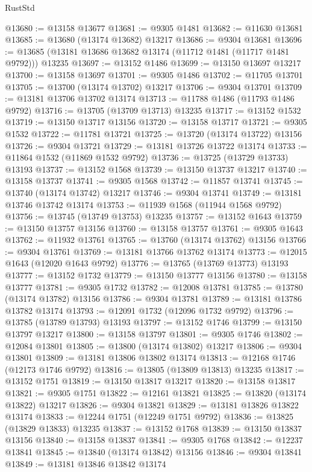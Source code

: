 \begin{lexlean}{RustStd}
\begin{coremodule}
@13680 := @13158 @13677
@13681 := @9305 @1481
@13682 := @11630 @13681
@13685 := @13680 (@13174 @13682) @13217
@13686 := @9304 @13681
@13696 := @13685 (@13181 @13686 @13682 @13174 (@11712 @1481 (@11717 @1481 @9792))) @13235
@13697 := @13152 @1486
@13699 := @13150 @13697 @13217
@13700 := @13158 @13697
@13701 := @9305 @1486
@13702 := @11705 @13701
@13705 := @13700 (@13174 @13702) @13217
@13706 := @9304 @13701
@13709 := @13181 @13706 @13702 @13174
@13713 := @11788 @1486 (@11793 @1486 @9792)
@13716 := @13705 (@13709 @13713) @13235
@13717 := @13152 @1532
@13719 := @13150 @13717 @13156
@13720 := @13158 @13717
@13721 := @9305 @1532
@13722 := @11781 @13721
@13725 := @13720 (@13174 @13722) @13156
@13726 := @9304 @13721
@13729 := @13181 @13726 @13722 @13174
@13733 := @11864 @1532 (@11869 @1532 @9792)
@13736 := @13725 (@13729 @13733) @13193
@13737 := @13152 @1568
@13739 := @13150 @13737 @13217
@13740 := @13158 @13737
@13741 := @9305 @1568
@13742 := @11857 @13741
@13745 := @13740 (@13174 @13742) @13217
@13746 := @9304 @13741
@13749 := @13181 @13746 @13742 @13174
@13753 := @11939 @1568 (@11944 @1568 @9792)
@13756 := @13745 (@13749 @13753) @13235
@13757 := @13152 @1643
@13759 := @13150 @13757 @13156
@13760 := @13158 @13757
@13761 := @9305 @1643
@13762 := @11932 @13761
@13765 := @13760 (@13174 @13762) @13156
@13766 := @9304 @13761
@13769 := @13181 @13766 @13762 @13174
@13773 := @12015 @1643 (@12020 @1643 @9792)
@13776 := @13765 (@13769 @13773) @13193
@13777 := @13152 @1732
@13779 := @13150 @13777 @13156
@13780 := @13158 @13777
@13781 := @9305 @1732
@13782 := @12008 @13781
@13785 := @13780 (@13174 @13782) @13156
@13786 := @9304 @13781
@13789 := @13181 @13786 @13782 @13174
@13793 := @12091 @1732 (@12096 @1732 @9792)
@13796 := @13785 (@13789 @13793) @13193
@13797 := @13152 @1746
@13799 := @13150 @13797 @13217
@13800 := @13158 @13797
@13801 := @9305 @1746
@13802 := @12084 @13801
@13805 := @13800 (@13174 @13802) @13217
@13806 := @9304 @13801
@13809 := @13181 @13806 @13802 @13174
@13813 := @12168 @1746 (@12173 @1746 @9792)
@13816 := @13805 (@13809 @13813) @13235
@13817 := @13152 @1751
@13819 := @13150 @13817 @13217
@13820 := @13158 @13817
@13821 := @9305 @1751
@13822 := @12161 @13821
@13825 := @13820 (@13174 @13822) @13217
@13826 := @9304 @13821
@13829 := @13181 @13826 @13822 @13174
@13833 := @12244 @1751 (@12249 @1751 @9792)
@13836 := @13825 (@13829 @13833) @13235
@13837 := @13152 @1768
@13839 := @13150 @13837 @13156
@13840 := @13158 @13837
@13841 := @9305 @1768
@13842 := @12237 @13841
@13845 := @13840 (@13174 @13842) @13156
@13846 := @9304 @13841
@13849 := @13181 @13846 @13842 @13174

\end{coremodule}
\end{lexlean}
